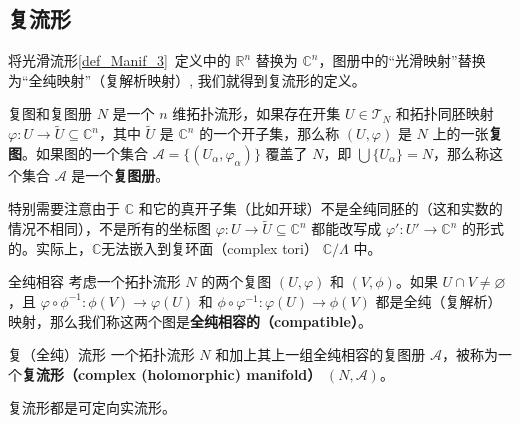 

\subsection{复流形}

将光滑流形\autoref{def_Manif_3}~定义中的 $\mathbb{R}^n$ 替换为 $\mathbb{C}^n$，图册中的“光滑映射”替换为“全纯映射”（复解析映射）, 我们就得到复流形的定义。


\begin{definition}{复图和复图册}
$N$ 是一个 $n$ 维拓扑流形，如果存在开集 $U \in \mathcal{T}_N$ 和拓扑同胚映射 $\varphi: U \rightarrow \tilde{U} \subseteq \mathbb{C}^n$，其中 $\tilde{U}$ 是 $\mathbb{C}^n$ 的一个开子集，那么称 $(U,\varphi)$ 是 $N$ 上的一张\textbf{复图}。如果图的一个集合 $\mathcal{A}=\{(U_\alpha, \varphi_\alpha)\}$ 覆盖了 $N$，即 $\bigcup\{U_\alpha\}=N$，那么称这个集合 $\mathcal{A}$ 是一个\textbf{复图册}。
\end{definition}

特别需要注意由于 $\mathbb{C}$ 和它的真开子集（比如开球）不是全纯同胚的（这和实数的情况不相同），不是所有的坐标图 $\varphi: U \rightarrow \tilde{U} \subseteq \mathbb{C}^n$ 都能改写成 $\varphi': U' \rightarrow \mathbb{C}^n$ 的形式的。实际上，$\mathbb{C}$无法嵌入到复环面（complex tori） $\mathbb{C} / \Lambda$ 中。

\begin{definition}{全纯相容}
考虑一个拓扑流形 $N$ 的两个复图 $(U, \varphi)$ 和 $(V, \phi)$。如果 $U \cap V \neq \varnothing$，且 $\varphi \circ \phi^{-1}: \phi(V) \rightarrow \varphi(U)$ 和 $\phi \circ \varphi^{-1}: \varphi(U) \rightarrow \phi(V)$ 都是全纯（复解析）映射，那么我们称这两个图是\textbf{全纯相容的（compatible）}。
\end{definition}

\begin{definition}{复（全纯）流形}\label{def_CMani_1}
一个拓扑流形 $N$ 和加上其上一组全纯相容的复图册 $\mathcal{A}$，被称为一个\textbf{复流形（complex (holomorphic) manifold）} $(N, \mathcal{A})$。
\end{definition}

\begin{theorem}{}
复流形都是可定向实流形。
\end{theorem}


